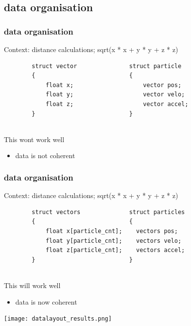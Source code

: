 \documentclass[compress]{beamer}
\begin{document}
\subsection{data organisation}
\begin{frame}[fragile]
    \frametitle{data organisation}
    Context: distance calculations; sqrt(x * x + y * y + z * z)
    \begin{verbatim}
        struct vector               struct particle
        {                           {
            float x;                    vector pos;
            float y;                    vector velo;
            float z;                    vector accel;
        }                           }
        
    \end{verbatim}
    This wont work well
    \begin{itemize}
        \item data is not coherent
    \end{itemize}
\end{frame}
  \begin{frame}[fragile]
    \frametitle{data organisation}
    Context: distance calculations; sqrt(x * x + y * y + z * z)
    \begin{verbatim}
        struct vectors              struct particles
        {                           {
            float x[particle_cnt];    vectors pos;
            float y[particle_cnt];    vectors velo;
            float z[particle_cnt];    vectors accel;
        }                           }
        
    \end{verbatim}
    This will work well
    \begin{itemize}
        \item data is now coherent
    \end{itemize}
\end{frame}    
\begin{frame}
    \texttt{[image: datalayout\_results.png]}
\end{frame} 
\end{document}

